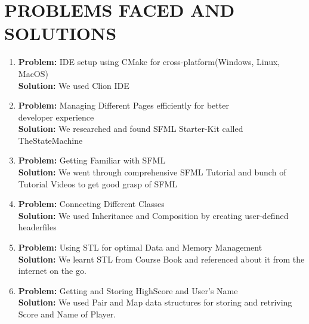 \newpage
\section{PROBLEMS FACED AND SOLUTIONS}

\begin{enumerate}
	\item \textbf{Problem:} IDE setup using CMake for cross-platform(Windows, Linux, MacOS) \\ \textbf{Solution:} We used Clion IDE
	
	\item \textbf{Problem:} Managing Different Pages efficiently for better\\ developer experience \\ \textbf{Solution:} We researched and found SFML Starter-Kit called \\TheStateMachine
	
	\item \textbf{Problem:} Getting Familiar with SFML \\ \textbf{Solution:} We went through comprehensive SFML Tutorial and bunch of Tutorial Videos to get good grasp of SFML 
	
	\item \textbf{Problem:} Connecting Different Classes \\ \textbf{Solution:} We used Inheritance and Composition by creating user-defined headerfiles 
	
	\item \textbf{Problem:} Using STL for optimal Data and Memory Management  \\ \textbf{Solution:} We learnt STL from Course Book and referenced about it from the internet on the go.
	
	\item \textbf{Problem:} Getting and Storing HighScore and User's Name  \\ \textbf{Solution:} We used Pair and Map data structures for storing and retriving Score and Name of Player.
	
	
\end{enumerate}